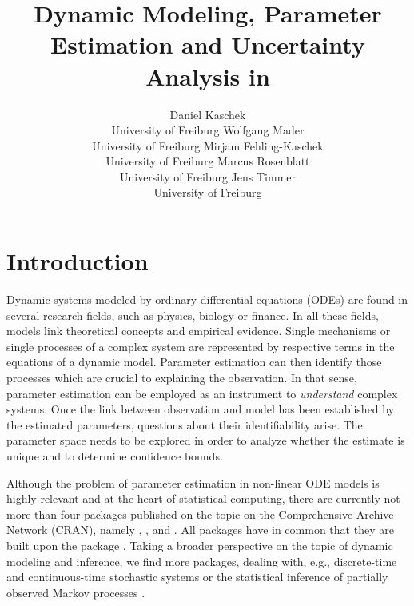 \documentclass[article]{jss}
\author{Daniel Kaschek\\University of Freiburg \And
	Wolfgang Mader\\University of Freiburg \AND
	Mirjam Fehling-Kaschek\\University of Freiburg \And
	Marcus Rosenblatt\\University of Freiburg \And
	Jens Timmer\\University of Freiburg}
\title{Dynamic Modeling, Parameter Estimation and Uncertainty Analysis in \proglang{R}}
\begin{document}
\section{Introduction}

Dynamic systems modeled by ordinary differential equations (ODEs) are found in several research fields, such as physics, biology or finance. In all these fields, models link theoretical concepts and empirical evidence.
Single mechanisms or single processes of a complex system are represented by respective terms in the equations of a dynamic model. Parameter estimation can then identify those processes which are crucial to explaining the observation.
In that sense, parameter estimation can be employed as an instrument to \textit{understand} complex systems. Once the link between observation and model has been established by the estimated parameters, questions about their identifiability arise. The parameter space needs to be explored in order to analyze whether the estimate is unique and to determine confidence bounds.

Although the problem of parameter estimation in non-linear ODE models is highly relevant and at the heart of statistical computing, there are currently not more than four  packages published on the topic on the Comprehensive  Archive Network (CRAN), namely  \citep{FME},  \citep{nlmeODE},  \citep{mkin} and  \citep{scaRabee}. All packages have in common that they are built upon the  package \citep{deSolve}. Taking a broader perspective on the topic of dynamic modeling and inference, we find more packages, dealing with, e.g., discrete-time and continuous-time stochastic systems \citep{CollocInfer} or the statistical inference of partially observed Markov processes \citep{pomp}.
\end{document}
